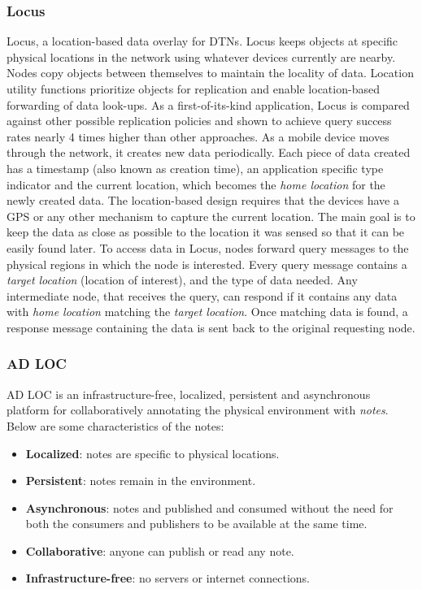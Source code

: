 \subsubsection{Locus \cite{Thompson:2010:LLD:1859934.1859945}}
Locus, a location-based data overlay for DTNs. Locus keeps objects at specific physical locations in the network using whatever devices currently are nearby. Nodes copy objects between themselves to maintain the locality of data. Location utility functions prioritize objects for replication and enable location-based forwarding of data look-ups. As a first-of-its-kind application, Locus is compared against other possible replication policies and shown to achieve query success rates nearly 4 times higher than other approaches.
As a mobile device moves through the network, it creates new data periodically. Each piece of data created has a timestamp (also known as creation time), an application specific type indicator and the current location, which becomes the \textit{home location} for the newly created data. The location-based design requires that the devices have a GPS or any other mechanism to capture the current location. The main goal is to keep the data as close as possible to the location it was sensed so that it can be easily found later.
To access data in Locus, nodes forward query messages to the physical regions in which the node is interested. Every query message contains a \textit{target location} (location of interest), and the type of data needed. Any intermediate node, that receives the query, can respond if it contains any data with \textit{home location} matching the \textit{target location}. Once matching data is found, a response message containing the data is sent back to the original requesting node.

\subsubsection{AD LOC \cite{Corbett2006ADL}}
AD LOC is an infrastructure-free, localized, persistent and asynchronous platform for collaboratively annotating the physical environment with \textit{notes}. Below are some characteristics of the notes:

\begin{itemize}
  \item \textbf{Localized}: notes are specific to physical locations.
  \item \textbf{Persistent}: notes remain in the environment.
  \item \textbf{Asynchronous}: notes and published and consumed without the need for both the consumers and publishers to be available at the same time.
  \item \textbf{Collaborative}: anyone can publish or read any note.
  \item \textbf{Infrastructure-free}: no servers or internet connections.
\end{itemize}

